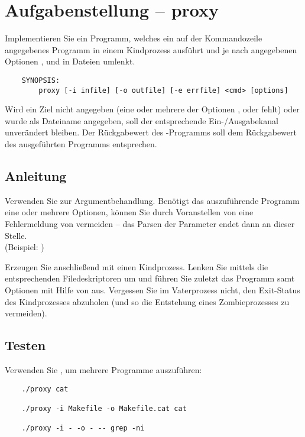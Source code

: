 




\section*{Aufgabenstellung -- proxy}

Implementieren Sie ein Programm, welches ein auf der Kommandozeile angegebenes
Programm in einem Kindprozess ausführt und je nach angegebenen Optionen
,  und  in Dateien umlenkt.

\begin{verbatim}
    SYNOPSIS:
        proxy [-i infile] [-o outfile] [-e errfile] <cmd> [options]
\end{verbatim}

Wird ein Ziel nicht angegeben (eine oder mehrere der Optionen ,
 oder  fehlt) oder wurde \osuearg{-} als Dateiname
angegeben, soll der entsprechende Ein-/Ausgabekanal unverändert bleiben. Der
Rückgabewert des -Programms soll dem Rückgabewert des
ausgeführten Programms entsprechen.

\subsection*{Anleitung}

Verwenden Sie  zur Argumentbehandlung. Benötigt das
auszuführende Programm eine oder mehrere Optionen, können Sie durch Voranstellen
von \osuearg{--} eine Fehlermeldung von  vermeiden -- das
Parsen der Parameter endet dann an dieser Stelle.\\
(Beispiel: )

Erzeugen Sie anschließend mit  einen Kindprozess. Lenken Sie
mittels  die entsprechenden Filedeskriptoren um und führen Sie
zuletzt das Programm samt Optionen mit Hilfe von  aus.
Vergessen Sie im Vaterprozess nicht, den Exit-Status des Kindprozesses abzuholen
(und so die Entstehung eines Zombieprozesses zu vermeiden).

\subsection*{Testen}

Verwenden Sie , um mehrere Programme auszuführen:

\begin{verbatim}
	./proxy cat

	./proxy -i Makefile -o Makefile.cat cat

	./proxy -i - -o - -- grep -ni
\end{verbatim}

\osueguidelinestwo



